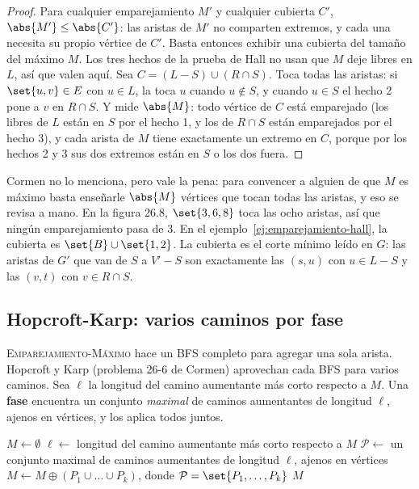 \documentclass[11pt,letterpaper]{article}
\begin{document}
\begin{proof}
  Para cualquier emparejamiento $M'$ y cualquier cubierta $C'$,
  $\abs{M'} \le \abs{C'}$: las aristas de $M'$ no comparten extremos,
  y cada una necesita su propio vértice de $C'$. Basta entonces
  exhibir una cubierta del tamaño del máximo $M$. Los tres hechos de
  la prueba de Hall no usan que $M$ deje libres en $L$, así que valen
  aquí. Sea $C = (L - S) \cup (R \cap S)$. Toca todas las aristas: si
  $\set{u, v} \in E$ con $u \in L$, la toca $u$ cuando $u \notin S$, y
  cuando $u \in S$ el hecho 2 pone a $v$ en $R \cap S$. Y mide
  $\abs{M}$: todo vértice de $C$ está emparejado (los libres de $L$
  están en $S$ por el hecho 1, y los de $R \cap S$ están emparejados
  por el hecho 3), y cada arista de $M$ tiene exactamente un extremo
  en $C$, porque por los hechos 2 y 3 sus dos extremos están en $S$ o
  los dos fuera.
\end{proof}

Cormen no lo menciona, pero vale la pena: para convencer a alguien de
que $M$ es máximo basta enseñarle $\abs{M}$ vértices que tocan todas
las aristas, y eso se revisa a mano. En la figura 26.8,
$\set{3, 6, 8}$ toca las ocho aristas, así que ningún emparejamiento
pasa de $3$. En el ejemplo~\ref{ej:emparejamiento-hall}, la cubierta es
$\set{B} \cup \set{1, 2}$. La cubierta es el corte mínimo leído en
$G$: las aristas de $G'$ que van de $S$ a $V' - S$ son exactamente las
$(s, u)$ con $u \in L - S$ y las $(v, t)$ con $v \in R \cap S$.


\subsection*{Hopcroft-Karp: varios caminos por fase}

\textsc{Emparejamiento-Máximo} hace un BFS completo para agregar una
sola arista. Hopcroft y Karp (problema 26-6 de Cormen) aprovechan
cada BFS para varios caminos. Sea $\ell$ la longitud del camino
aumentante más corto respecto a $M$. Una \textbf{fase} encuentra un
conjunto \emph{maximal} de caminos aumentantes de longitud $\ell$,
ajenos en vértices, y los aplica todos juntos.

\begin{algorithm}[H]
\caption{\textsc{Hopcroft-Karp}$(G)$}
\label{alg:emparejamiento-hopcroft-karp}
\begin{algorithmic}[1]
  \State $M \gets \emptyset$
  \Repeat
    \State $\ell \gets$ longitud del camino aumentante más corto
           respecto a $M$
    \State $\mathcal{P} \gets$ un conjunto maximal de caminos
           aumentantes de longitud $\ell$, ajenos en vértices
    \State $M \gets M \oplus (P_1 \cup \dots \cup P_k)$, donde
           $\mathcal{P} = \set{P_1, \dots, P_k}$
  \State \Return $M$
\EndProcedure
\end{algorithmic}
\end{algorithm}
\end{document}
